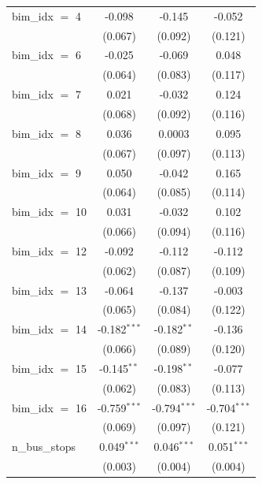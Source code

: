 \begin{tabular}{lccc}
   bim\_idx $=$ 4      & -0.098         & -0.145          & -0.052\\   
                       & (0.067)        & (0.092)         & (0.121)\\   
   bim\_idx $=$ 6      & -0.025         & -0.069          & 0.048\\   
                       & (0.064)        & (0.083)         & (0.117)\\   
   bim\_idx $=$ 7      & 0.021          & -0.032          & 0.124\\   
                       & (0.068)        & (0.092)         & (0.116)\\   
   bim\_idx $=$ 8      & 0.036          & 0.0003          & 0.095\\   
                       & (0.067)        & (0.097)         & (0.113)\\   
   bim\_idx $=$ 9      & 0.050          & -0.042          & 0.165\\   
                       & (0.064)        & (0.085)         & (0.114)\\   
   bim\_idx $=$ 10     & 0.031          & -0.032          & 0.102\\   
                       & (0.066)        & (0.094)         & (0.116)\\   
   bim\_idx $=$ 12     & -0.092         & -0.112          & -0.112\\   
                       & (0.062)        & (0.087)         & (0.109)\\   
   bim\_idx $=$ 13     & -0.064         & -0.137          & -0.003\\   
                       & (0.065)        & (0.084)         & (0.122)\\   
   bim\_idx $=$ 14     & -0.182$^{***}$ & -0.182$^{**}$   & -0.136\\   
                       & (0.066)        & (0.089)         & (0.120)\\   
   bim\_idx $=$ 15     & -0.145$^{**}$  & -0.198$^{**}$   & -0.077\\   
                       & (0.062)        & (0.083)         & (0.113)\\   
   bim\_idx $=$ 16     & -0.759$^{***}$ & -0.794$^{***}$  & -0.704$^{***}$\\   
                       & (0.069)        & (0.097)         & (0.121)\\   
   n\_bus\_stops       & 0.049$^{***}$  & 0.046$^{***}$   & 0.051$^{***}$\\   
                       & (0.003)        & (0.004)         & (0.004)\\   

\end{tabular}
